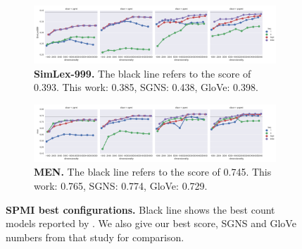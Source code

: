 \begin{figure}
  \centering
  \begin{subfigure}[b]{\textwidth}
    \centerline{\includegraphics[width=1.1\textwidth]{supplement/figures/SimLex999-best}}
    \caption{\textbf{SimLex-999.} The black line refers to the score of 0.393.
      This work: 0.385,
      SGNS: 0.438,
      GloVe: 0.398.
    }
    \label{fig:simlex-ppmi-best-simlex}
  \end{subfigure}

  \begin{subfigure}[b]{\textwidth}
    \centerline{\includegraphics[width=1.1\textwidth]{supplement/figures/men-best}}
    \caption{\textbf{MEN.} The black line refers to the score of 0.745.
      This work: 0.765,
      SGNS: 0.774,
      GloVe: 0.729.
    }
    \label{fig:simlex-ppmi-best-men}
  \end{subfigure}

  \caption{\textbf{SPMI best configurations.} Black line shows the best count models reported by \protect{}. We also give our best score, SGNS and GloVe numbers from that study for comparison.}
  \label{fig:simlex-ppmi-best}
\end{figure}

